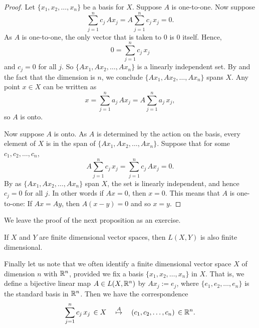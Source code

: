 \begin{proof}
Let $\{ x_1,x_2,\ldots,x_n \}$ be a basis for $X$.
Suppose $A$ is one-to-one.  Now suppose
\begin{equation*}
\sum_{j=1}^n c_j \, Ax_j =
A\sum_{j=1}^n c_j \, x_j =
0 .
\end{equation*}
As $A$ is one-to-one,
the only vector that is taken to 0 is 0 itself.  
Hence,
\begin{equation*}
0 =
\sum_{j=1}^n c_j \, x_j
\end{equation*}
and $c_j = 0$ for all $j$.
So $\{ Ax_1, Ax_2, \ldots, Ax_n \}$ is a linearly independent set.
By 
and the fact that the dimension is $n$, we conclude
$\{ Ax_1, Ax_2, \ldots, Ax_n \}$ spans $X$.  Any point $x \in X$
can be written as
\begin{equation*}
x = \sum_{j=1}^n a_j \, Ax_j =
A\sum_{j=1}^n a_j \, x_j ,
\end{equation*}
so $A$ is onto.

Now suppose $A$ is onto.  As $A$ is determined by the action on
the basis, every element of $X$ is in the span of
$\{ Ax_1, Ax_2, \ldots, Ax_n \}$.  Suppose that for some
$c_1,c_2,\ldots,c_n$,
\begin{equation*}
A\sum_{j=1}^n c_j \, x_j =
\sum_{j=1}^n c_j \, Ax_j = 0 .
\end{equation*}
By 
as $\{ Ax_1, Ax_2, \ldots, Ax_n \}$ span $X$, the set is linearly independent,
and hence $c_j = 0$ for all $j$.  In other words if $Ax = 0$, then $x=0$.  This means that
$A$ is one-to-one:  If $Ax = Ay$, then $A(x-y) = 0$ and so
$x=y$.
\end{proof}

We leave the proof of the next proposition as an exercise.

\begin{prop} \label{prop:LXYfinitedim}
If $X$ and $Y$ are finite dimensional vector spaces, then $L(X,Y)$
is also finite dimensional.
\end{prop}

Finally let us note that we often identify a finite dimensional vector
space $X$ of dimension $n$ with ${\mathbb{R}}^n$, provided we fix a basis $\{ x_1,
x_2, \ldots, x_n \}$ in $X$.  That is, we define a bijective
linear map $A \in L(X,{\mathbb{R}}^n)$ by
$Ax_j := e_j$, where $\{ e_1, e_2, \ldots, e_n \}$ is the standard
basis in ${\mathbb{R}}^n$.  Then we have
the correspondence 
\begin{equation*}
\sum_{j=1}^n c_j \, x_j \, \in X
\quad
\overset{A}{\mapsto}
\quad
(c_1,c_2,\ldots,c_n) \, \in {\mathbb{R}}^n .
\end{equation*}

